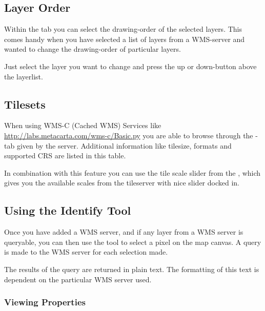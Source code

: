 \subsection{Layer Order} \label{sec:layerorder}

Within the tab  you can select the drawing-order of the
selected layers. This comes handy when you have selected a list of layers from a
WMS-server and wanted to change the drawing-order of particular layers.

Just select the layer you want to change and press the up or down-button
above the layerlist.

%
%
\subsection{Tilesets}\label{sec:tilesets}

When using WMS-C (Cached WMS) Services like
\url{http://labs.metacarta.com/wms-c/Basic.py} you are able to browse
through the -tab given by the server. Additional information like
tilesize, formats and supported CRS are listed in this table.

In combination with this feature you can use the tile scale slider from
the  \arrow {}, which gives you
the available scales from the tileserver with nice slider docked in.

%
%
\subsection{Using the Identify Tool}\label{sec:ogc-wms-identify}

Once you have added a WMS server,
and if any layer from a WMS server is queryable, you can then use
the  tool to select a pixel on the map canvas.
A query is made to the WMS server for each selection made.

The results of the query are returned in plain text.
The formatting of this text is dependent on the particular
WMS server used.

\subsubsection{Viewing Properties}\label{sec:ogc-wms-properties}

